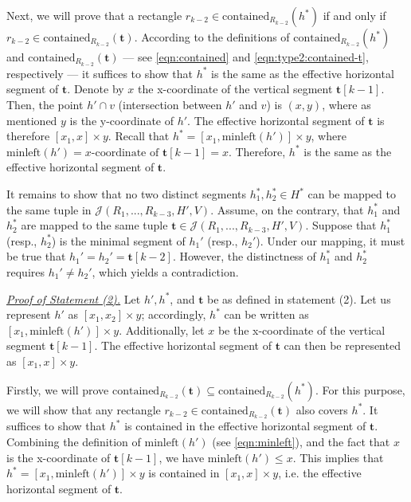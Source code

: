 \documentclass[acmsmall,review,anonymous]{acmart}
\def\vgap{\vspace{1mm}}
\def\extraspacing{\vspace{2mm} \noindent}
\def\J{\mathcal{J}}
\def\minleft{\mathrm{minleft}}
\def\contained{\mathrm{contained}}
\begin{document}
{{{Next, we will prove that a rectangle $r_{k-2} \in \contained_{R_{k-2}}(h^*)$ if and only if $r_{k-2} \in \contained_{R_{k-2}}(\bm{t})$. According to the definitions of $\contained_{R_{k-2}}(h^*)$ and $\contained_{R_{k-2}}(\bm{t})$ --- see \eqref{eqn:contained} and \eqref{eqn:type2:contained-t}, respectively --- it suffices to show that $h^*$ is the same as the effective horizontal segment of $\bm{t}$. Denote by $x$ the x-coordinate of the vertical segment $\bm{t}[k-1]$. Then, the point $h' \cap v$ (intersection between $h'$ and $v$) is $(x,y)$, where as mentioned $y$ is the y-coordinate of $h'$. The effective horizontal segment of $\bm{t}$ is therefore $[x_1,x]\times y$. Recall that $h^* = [x_1,\minleft(h')]\times y$, where $\minleft(h') = \text{$x$-coordinate of $\bm{t}[k-1]$} = x$. Therefore, $h^*$ is the same as the effective horizontal segment of $\bm{t}$.

\vgap

It remains to show that no two distinct segments $h_1^*, h_2^* \in H^*$ can be mapped to the same tuple in $\J(R_1,...,R_{k-3}, H',V)$. Assume, on the contrary, that $h_1^*$ and $h_2^*$ are mapped to the same tuple $\bm{t}\in \J(R_1,...,R_{k-3}, H',V)$. Suppose that $h_1^*$ (resp., $h_2^*$) is the minimal segment of $h_1'$ (resp., $h_2'$). Under our mapping, it must be true that  $h_1' = h_2' = \bm{t}[k-2]$. However, the distinctness of $h_1^*$ and $h_2^*$ requires $h_1' \ne h_2'$, which yields a contradiction.

\extraspacing \underline{\em Proof of Statement (2).} Let $h', h^*$, and $\bm{t}$ be as defined in statement (2). Let us represent $h'$ as $[x_1,x_2] \times y$; accordingly, $h^*$ can be written as $[x_1, \minleft(h')] \times y$. Additionally, let $x$ be the x-coordinate of the vertical segment $\bm{t}[k-1]$. The effective horizontal segment of $\bm{t}$ can then be represented as $[x_1,x] \times y$.


\vgap

Firstly, we will prove $\contained_{R_{k-2}}(\bm{t})\subseteq \contained_{R_{k-2}}(h^*)$. For this purpose, we will show that any rectangle $r_{k-2} \in \contained_{R_{k-2}}(\bm{t})$ also covers $h^*$. It suffices to show that $h^*$ is contained in the effective horizontal segment of $\bm{t}$. Combining the definition of $\minleft(h')$ (see \eqref{eqn:minleft}), and the fact that $x$ is the x-coordinate of $\bm{t}[k-1]$, we have $\minleft(h') \le x$. This implies that $h^* = [x_1, \minleft(h')] \times y$ is contained in $[x_1, x] \times y$, i.e. the effective horizontal segment of $\bm{t}$.

}}}
\end{document}
